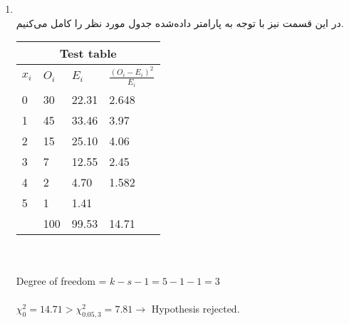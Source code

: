 \begin{enumerate}
\item \phantom{text}
\\
در این قسمت نیز با توجه به پارامتر داده‌شده جدول مورد نظر را کامل می‌کنیم.
\\
\begin{latin}
    \noindent
    \begin{tabular}{ |p{3cm}||p{3cm}|p{3cm}|p{3cm}|  }
        \hline
        \multicolumn{4}{|c|}{Test table}                    \\
        \hline
        $x_i$ & $O_i$ & $E_i$ & $\frac{(O_i-E_i)^2}{E_i}$   \\
        \hline
        0     & 30    & 22.31   & 2.648                        \\
        1     & 45    & 33.46  & 3.97                        \\
        2     & 15    & 25.10   & 4.06                         \\
        3     & 7    & 12.55   &  2.45                        \\
        4     & 2    & 4.70   & 1.582                        \\
        5     & 1    & 1.41  &                          \\
        \hline
              & 100      &  99.53      & 14.71                         \\
        \hline
    \end{tabular}
    \\\\
    Degree of freedom = $k-s-1=5 - 1 -1 = 3$ \\\\
    $\chi_0^2 = 14.71 > \chi_{0.05,3}^2=7.81 \rightarrow$ Hypothesis rejected.
\end{latin}



\end{enumerate}